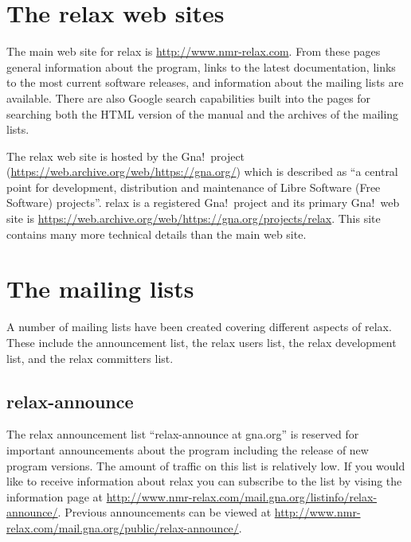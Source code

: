
\section{The relax web sites}

The main web site for relax is \href{http://www.nmr-relax.com}{http://www.nmr-relax.com}.
From these pages general information about the program, links to the latest documentation, links to the most current software releases, and information about the mailing lists are available.
There are also Google search capabilities built into the pages for searching both the HTML version of the manual and the archives of the mailing lists.

The relax web site is hosted by the Gna!\ project (\href{https://web.archive.org/web/https://gna.org/}{https://web.archive.org/web/https://gna.org/}) which is described as ``a central point for development, distribution and maintenance of Libre Software (Free Software) projects''.
relax is a registered Gna!\ project and its primary Gna!\ web site is \href{https://web.archive.org/web/https://gna.org/projects/relax}{https://web.archive.org/web/https://gna.org/projects/relax}.
This site contains many more technical details than the main web site.




\section{The mailing lists}

A number of mailing lists have been created covering different aspects of relax.
These include the announcement list, the relax users list, the relax development list, and the relax committers list.


\subsection{relax-announce}

The relax announcement list ``relax-announce at gna.org'' is reserved for important announcements about the program including the release of new program versions.
The amount of traffic on this list is relatively low.
If you would like to receive information about relax you can subscribe to the list by vising the information page at \href{http://www.nmr-relax.com/mail.gna.org/listinfo/relax-announce/}{http://www.nmr-relax.com/mail.gna.org/listinfo/relax-announce/}.
Previous announcements can be viewed at \href{http://www.nmr-relax.com/mail.gna.org/public/relax-announce/}{http://www.nmr-relax.com/mail.gna.org/public/relax-announce/}.


